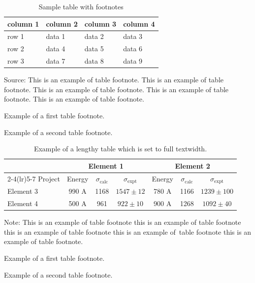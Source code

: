 \documentclass[twoside,12pt]{article}
\begin{document}
\begin{table}[!ht]
\caption{Sample table with footnotes\label{tab1}}
\begin{threeparttable}
\begin{tabular*}{\columnwidth}{@{\extracolsep\fill}llll@{\extracolsep\fill}}
\toprule
column 1 & column 2 & column 3 & column 4\\
\midrule
row 1 & data 1 & data 2 & data 3 \\
row 2 & data 4 & data 5\tnote{1} & data 6 \\
row 3 & data 7 & data 8 & data 9\tnote{2} \\
\bottomrule
\end{tabular*}
\begin{tablenotes}
\item Source: This is an example of table footnote. This is an example of table footnote. This is an example of table footnote. This is an example of table footnote. This is an example of table footnote.
\item[1] Example of a first table footnote.
\item[2] Example of a second table footnote.
\end{tablenotes}
\end{threeparttable}
\end{table}

\lipsum[4]
\begin{table}[!h]
\caption{Example of a lengthy table which is set to full textwidth.\label{tab2}}
\tabcolsep=0pt
\begin{threeparttable}
\begin{tabular*}{\textwidth}{@{\extracolsep{\fill}}lcccccc@{\extracolsep{\fill}}}
\toprule
& \multicolumn{3}{c}{Element 1\tnote{1}} & \multicolumn{3}{c}{Element 2\tnote{2}} \\
\cmidrule(lr){2-4}\cmidrule(lr){5-7}
Project & Energy & $\sigma_{\mathrm{calc}}$ & $\sigma_{\mathrm{expt}}$ & Energy & $\sigma_{\mathrm{calc}}$ & $\sigma_{\mathrm{expt}}$ \\
\midrule
Element 3 & 990 A & 1168 & $1547\pm12$ & 780 A & 1166 & $1239\pm100$ \\
Element 4 & 500 A & 961 & $922\pm10$ & 900 A & 1268 & $1092\pm40$ \\
\bottomrule
\end{tabular*}
\begin{tablenotes}
\item Note: This is an example of table footnote this is an example of table footnote this is an example of table footnote this is an example of~table footnote this is an example of table footnote.
\item[1] Example of a first table footnote.
\item[2] Example of a second table footnote.
\end{tablenotes}
\end{threeparttable}
\end{table}
\end{document}
